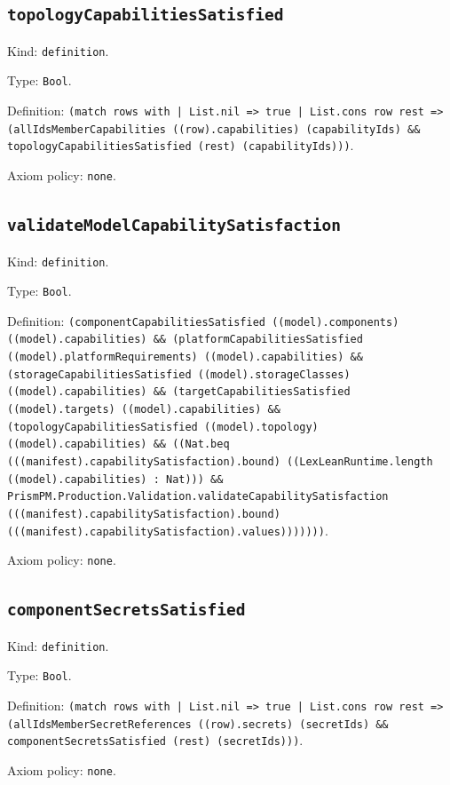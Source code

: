 \documentclass[11pt]{article}
\begin{document}
\subsection*{\texttt{topologyCapabilitiesSatisfied}}
\noindent Kind: \texttt{definition}.\par
\noindent Type: \texttt{Bool}.\par
\noindent Definition: \texttt{(match rows with | List.nil => true | List.cons row rest => (allIdsMemberCapabilities ((row).capabilities) (capabilityIds) \&\& topologyCapabilitiesSatisfied (rest) (capabilityIds)))}.\par
\noindent Axiom policy: \texttt{none}.\par
\subsection*{\texttt{validateModelCapabilitySatisfaction}}
\noindent Kind: \texttt{definition}.\par
\noindent Type: \texttt{Bool}.\par
\noindent Definition: \texttt{(componentCapabilitiesSatisfied ((model).components) ((model).capabilities) \&\& (platformCapabilitiesSatisfied ((model).platformRequirements) ((model).capabilities) \&\& (storageCapabilitiesSatisfied ((model).storageClasses) ((model).capabilities) \&\& (targetCapabilitiesSatisfied ((model).targets) ((model).capabilities) \&\& (topologyCapabilitiesSatisfied ((model).topology) ((model).capabilities) \&\& ((Nat.beq (((manifest).capabilitySatisfaction).bound) ((LexLeanRuntime.length ((model).capabilities) : Nat))) \&\& PrismPM.Production.Validation.validateCapabilitySatisfaction (((manifest).capabilitySatisfaction).bound) (((manifest).capabilitySatisfaction).values)))))))}.\par
\noindent Axiom policy: \texttt{none}.\par
\subsection*{\texttt{componentSecretsSatisfied}}
\noindent Kind: \texttt{definition}.\par
\noindent Type: \texttt{Bool}.\par
\noindent Definition: \texttt{(match rows with | List.nil => true | List.cons row rest => (allIdsMemberSecretReferences ((row).secrets) (secretIds) \&\& componentSecretsSatisfied (rest) (secretIds)))}.\par
\noindent Axiom policy: \texttt{none}.\par
\end{document}

